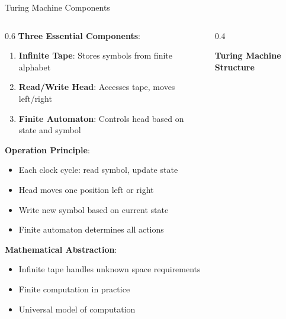 \documentclass[aspectratio=169]{beamer}
\newcommand{\concept}[1]{\textbf{\color{darkblue}#1}}
\begin{document}
\begin{frame}{Turing Machine Components}
\begin{columns}
\begin{column}{0.6\textwidth}
\concept{Three Essential Components}:
\begin{enumerate}
\item \textbf{Infinite Tape}: Stores symbols from finite alphabet
\item \textbf{Read/Write Head}: Accesses tape, moves left/right
\item \textbf{Finite Automaton}: Controls head based on state and symbol
\end{enumerate}

\vspace{0.3cm}
\concept{Operation Principle}:
\begin{itemize}
\item Each clock cycle: read symbol, update state
\item Head moves one position left or right
\item Write new symbol based on current state
\item Finite automaton determines all actions
\end{itemize}

\vspace{0.3cm}
\concept{Mathematical Abstraction}:
\begin{itemize}
\item Infinite tape handles unknown space requirements
\item Finite computation in practice
\item Universal model of computation
\end{itemize}
\end{column}
\begin{column}{0.4\textwidth}
\begin{center}
\textbf{Turing Machine Structure}
\vspace{0.3cm}

\end{center}
\end{column}
\end{columns}
\end{frame}
\end{document}
